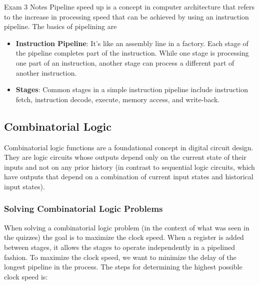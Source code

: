 \begin{examnotes}{Exam 3 Notes}
    Pipeline speed up is a concept in computer architecture that refers to the increase in processing speed that can be achieved by using an instruction pipeline. The basics of pipelining are

    \begin{itemize}
        \item \textbf{Instruction Pipeline}: It's like an assembly line in a factory. Each stage of the pipeline completes part of the instruction. While one stage is processing one part of an instruction, 
        another stage can process a different part of another instruction.
        \item \textbf{Stages}: Common stages in a simple instruction pipeline include instruction fetch, instruction decode, execute, memory access, and write-back.
    \end{itemize}

    \subsection*{Combinatorial Logic}

    Combinatorial logic functions are a foundational concept in digital circuit design. They are logic circuits whose outputs depend only on the current state of their inputs and not on any prior 
    history (in contrast to sequential logic circuits, which have outputs that depend on a combination of current input states and historical input states).

    \subsubsection*{Solving Combinatorial Logic Problems}

    When solving a combinatorial logic problem (in the context of what was seen in the quizzes) the goal is to maximize the clock speed. When a register is added between stages, it allows the stages
    to operate independently in a pipelined fashion. To maximize the clock speed, we want to minimize the delay of the longest pipeline in the process. The steps for determining the highest possible
    clock speed is:


\end{examnotes}
